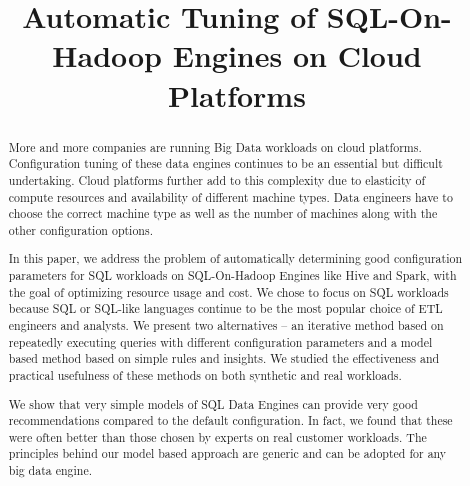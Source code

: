 \documentclass[10pt, conference, compsocconf]{IEEEtran}
\begin{document}
\title{Automatic Tuning of SQL-On-Hadoop Engines on Cloud Platforms}

\author{
	\and
	\and
}

\maketitle

\begin{abstract}
More and more companies are running Big Data workloads on cloud platforms. Configuration tuning of these data engines continues to be an essential but difficult undertaking. Cloud platforms further add to this complexity due to elasticity of compute resources and availability of different machine types. Data engineers have to choose the correct machine type as well as the number of machines along with the other configuration options.

In this paper, we address the problem of automatically determining good configuration parameters for SQL workloads on SQL-On-Hadoop Engines like Hive and Spark, with the goal of optimizing resource usage and cost. We chose to focus on SQL workloads because SQL or SQL-like languages continue to be the most popular choice of ETL engineers and analysts. We present two alternatives -- an iterative method based on repeatedly executing queries with different configuration parameters and a model based method based on simple rules and insights. We studied the effectiveness and practical usefulness of these methods on both synthetic and real workloads.

We show that very simple models of SQL Data Engines can provide very good recommendations compared to the default configuration. In fact, we found that these were often better than those chosen by experts on real customer workloads.  The principles behind our model based approach are generic and can be adopted for any big data engine. 
\end{abstract}

 
 
 
 
 
 
 
 

 
\end{document}
